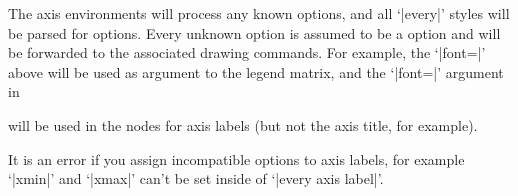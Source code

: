 The axis environments will process any known \PGFPlots{} options, and all
`|every|' styles will be parsed for \PGFPlots{} options. Every unknown option
is assumed to be a \Tikz{} option and will be forwarded to the associated
\Tikz{} drawing commands. For example, the `|font=\Large|' above will be used
as argument to the legend matrix, and the `|font=\Large|' argument in
%
\begin{codeexample}
\end{codeexample}
%
will be used in the nodes for axis labels (but not the axis title, for example).

It is an error if you assign incompatible options to axis labels, for example
`|xmin|' and `|xmax|' can't be set inside of `|every axis label|'.
